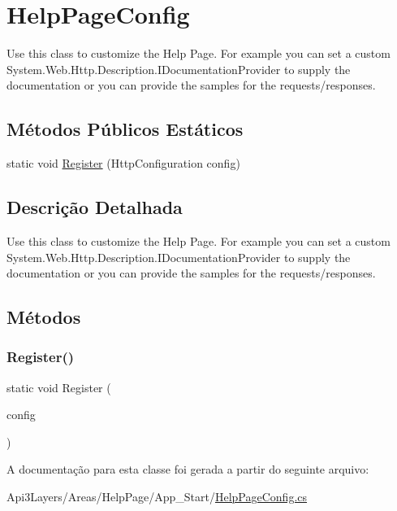 \hypertarget{classApi3Layers_1_1Areas_1_1HelpPage_1_1HelpPageConfig}{}\section{Help\+Page\+Config}
\label{classApi3Layers_1_1Areas_1_1HelpPage_1_1HelpPageConfig}


Use this class to customize the Help Page. For example you can set a custom System.\+Web.\+Http.\+Description.\+I\+Documentation\+Provider to supply the documentation or you can provide the samples for the requests/responses.  


\subsection*{Métodos Públicos Estáticos}
\begin{DoxyCompactItemize}
\item 
static void \hyperlink{classApi3Layers_1_1Areas_1_1HelpPage_1_1HelpPageConfig_a8941f9a1c4d63842b463068258264cf4}{Register} (Http\+Configuration config)
\end{DoxyCompactItemize}


\subsection{Descrição Detalhada}
Use this class to customize the Help Page. For example you can set a custom System.\+Web.\+Http.\+Description.\+I\+Documentation\+Provider to supply the documentation or you can provide the samples for the requests/responses. 



\subsection{Métodos}
\mbox{\label{classApi3Layers_1_1Areas_1_1HelpPage_1_1HelpPageConfig_a8941f9a1c4d63842b463068258264cf4}} 
\subsubsection{\texorpdfstring{Register()}{Register()}}
{\footnotesize\ttfamily static void Register (\begin{DoxyParamCaption}\item[{Http\+Configuration}]{config }\end{DoxyParamCaption})\hspace{0.3cm}{\ttfamily [static]}}



A documentação para esta classe foi gerada a partir do seguinte arquivo\+:\begin{DoxyCompactItemize}
\item 
Api3\+Layers/\+Areas/\+Help\+Page/\+App\+\_\+\+Start/\hyperlink{HelpPageConfig_8cs}{Help\+Page\+Config.\+cs}\end{DoxyCompactItemize}
